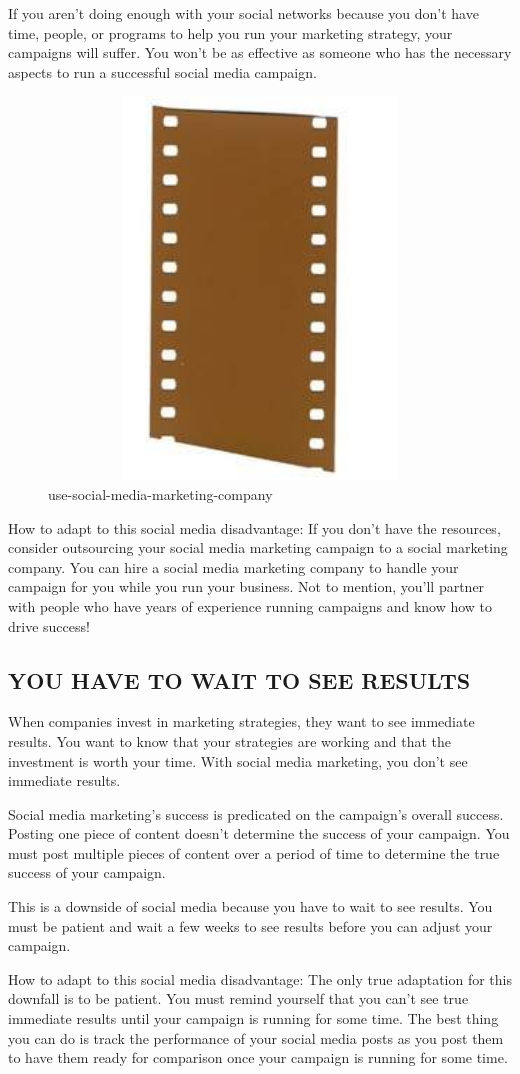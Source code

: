 \documentclass[a4paper]{article}
\begin{document}
If you aren’t doing enough with your social networks because you don’t have time, people, or programs to help you run your marketing strategy, your campaigns will suffer. You won’t be as effective as someone who has the necessary aspects to run a successful social media campaign.
\begin{figure}
\centering
\includegraphics[width=5in,height=4in]{ss}
\caption{use-social-media-marketing-company}
\end{figure}
How to adapt to this social media disadvantage: If you don’t have the resources, consider outsourcing your social media marketing campaign to a social marketing company. You can hire a social media marketing company to handle your campaign for you while you run your business. Not to mention, you’ll partner with people who have years of experience running campaigns and know how to drive success!
  \subsection{YOU HAVE TO WAIT TO SEE RESULTS}
 When companies invest in marketing strategies, they want to see immediate results. You want to know that your strategies are working and that the investment is worth your time. With social media marketing, you don’t see immediate results.

Social media marketing’s success is predicated on the campaign’s overall success. Posting one piece of content doesn’t determine the success of your campaign. You must post multiple pieces of content over a period of time to determine the true success of your campaign.

This is a downside of social media because you have to wait to see results. You must be patient and wait a few weeks to see results before you can adjust your campaign.

How to adapt to this social media disadvantage: The only true adaptation for this downfall is to be patient. You must remind yourself that you can’t see true immediate results until your campaign is running for some time. The best thing you can do is track the performance of your social media posts as you post them to have them ready for comparison once your campaign is running for some time.
\end{document}

